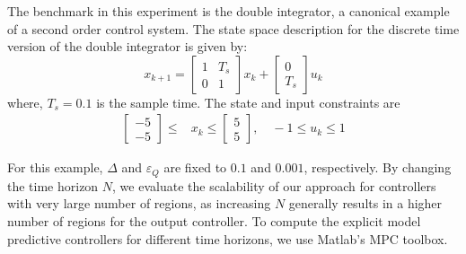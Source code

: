 The benchmark in this experiment is the double integrator, a canonical example
of a second order control system. The state space description
for the discrete time version of the double integrator is given by:
\begin{equation}
x_{k+1}=
\begin{bmatrix}
1 & T_s\\
0& 1	
\end{bmatrix}
x_k+
\begin{bmatrix}
0\\
T_s
\end{bmatrix}u_k
\label{eq:int2_ss}
\end{equation}
where, $T_s=0.1$ is the sample time. The state and input constraints are
\begin{align*}
	\begin{bmatrix}
		-5\\-5
	\end{bmatrix}\leq&
	x_k\leq
	\begin{bmatrix}
	5\\5
	\end{bmatrix}, \quad
	-1\leq u_k \leq 1
\end{align*}%


For this example, $\Delta$ and $\varepsilon_Q$ are fixed to $0.1$ and $0.001$,
respectively. By changing the time horizon $N$, we evaluate the scalability
of our approach for controllers with very large number of regions, as 
increasing $N$ generally results in a higher number of regions for the output controller. To
compute the explicit model predictive controllers for different time horizons,
we use Matlab's MPC toolbox. %
 

